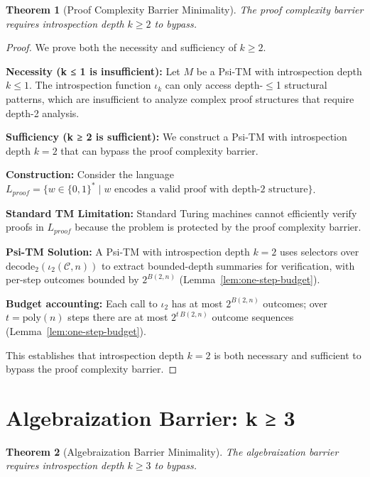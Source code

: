 \documentclass[11pt]{article}
\newtheorem{theorem}{Theorem}
\begin{document}
\begin{theorem}[Proof Complexity Barrier Minimality]
The proof complexity barrier requires introspection depth $k \geq 2$ to bypass.
\end{theorem}

\begin{proof}
We prove both the necessity and sufficiency of $k \geq 2$.

\textbf{Necessity (k ≤ 1 is insufficient):}
Let $M$ be a Psi-TM with introspection depth $k \leq 1$. The introspection function $\iota_k$ can only access depth-$\leq$1 structural patterns, which are insufficient to analyze complex proof structures that require depth-2 analysis.

\textbf{Sufficiency (k ≥ 2 is sufficient):}
We construct a Psi-TM with introspection depth $k = 2$ that can bypass the proof complexity barrier.

\textbf{Construction:}
Consider the language $L_{proof} = \{w \in \{0,1\}^* \mid w \text{ encodes a valid proof with depth-2 structure}\}$.

\textbf{Standard TM Limitation:}
Standard Turing machines cannot efficiently verify proofs in $L_{proof}$ because the problem is protected by the proof complexity barrier.

\textbf{Psi-TM Solution:}
A Psi-TM with introspection depth $k = 2$ uses selectors over $\mathrm{decode}_2(\iota_2(\mathcal{C},n))$ to extract bounded-depth summaries for verification, with per-step outcomes bounded by $2^{B(2,n)}$ (Lemma~\ref{lem:one-step-budget}).

\textbf{Budget accounting:}
Each call to $\iota_2$ has at most $2^{B(2,n)}$ outcomes; over $t=\mathrm{poly}(n)$ steps there are at most $2^{t\,B(2,n)}$ outcome sequences (Lemma~\ref{lem:one-step-budget}).

This establishes that introspection depth $k = 2$ is both necessary and sufficient to bypass the proof complexity barrier.
\end{proof}

\section{Algebraization Barrier: k ≥ 3}

\begin{theorem}[Algebraization Barrier Minimality]
The algebraization barrier requires introspection depth $k \geq 3$ to bypass.
\end{theorem}
\end{document}
